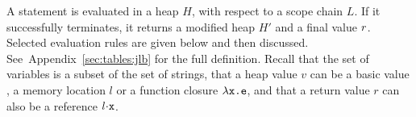 \documentclass{article}
\newcommand{\iflong}[1]{#1}
\newcommand{\ifshort}[1]{}
\begin{document}
%
A statement  is evaluated in a heap $H$, with respect to a scope chain $L$. If it successfully terminates, it returns a modified heap $H'$ and a final value $r$.
%
%
Selected evaluation rules are given below and then discussed. See~\ifshort{\cite{proofs}}\iflong{Appendix~\ref{sec:tables:jlb}} for the full definition.
%
Recall that the set of variables is a subset of the set of strings,
that a heap value $v$ can be a basic  value , a memory location
$l$ or a function closure $\lambda\mbox{\texttt{{\upshape x.e}}}$, and that a return value $r$ can also be a reference $l\sv\js{x}$.
%
%
\end{document}
